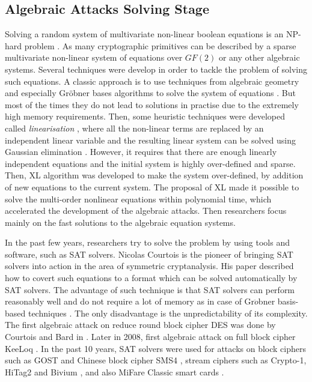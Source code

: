 \subsection{Algebraic Attacks Solving Stage}
Solving a random system of multivariate non-linear boolean equations is an NP-hard problem \cite{fraenkel1980complexity}. As many cryptographic primitives can be described by a sparse multivariate non-linear system of equations over $GF(2)$ or any other algebraic systems. Several techniques were develop in order to tackle the problem of solving such equations. A classic approach is to use techniques from algebraic geometry and especially Gr\"{o}bner bases algorithms to solve the system of equations \cite{faugere1999new}. But most of the times they do not lead to solutions in practise due to the extremely high memory requirements. Then, some heuristic techniques were developed called \textit{linearisation} \cite{courtois2000efficient}, where all the non-linear terms are replaced by an independent linear variable and the resulting linear system can be solved using Gaussian elimination \cite{sepehrdad2012statistical}. However, it requires that there are enough linearly independent equations and the initial system is highly over-defined and sparse. Then, XL algorithm \cite{courtois2000efficient,courtois2002cryptanalysis} was developed to make the system over-defined, by addition of new equations to the current system. The proposal of XL made it possible to solve the multi-order nonlinear equations within polynomial time, which accelerated the development of the algebraic attacks. Then researchers focus mainly on the fast solutions to the algebraic equation systems. 

In the past few years, researchers try to solve the problem by using tools and software, such as SAT solvers. Nicolas Courtois is the pioneer of bringing SAT solvers into action in the area of symmetric cryptanalysis. His paper \cite{cryptoeprint:2007:024,BardCourtoiJeffersonConv} described how to covert such equations to a format which can be solved automatically by SAT solvers. The advantage of such technique is that SAT solvers can perform reasonably well and do not require a lot of memory as in case of Gr$\ddot{o}$bner basis-based techniques \cite{grobner}. The only disadvantage is the unpredictability of its complexity. The first algebraic attack on reduce round block cipher DES was done by Courtois and Bard in  \cite{DEScourtois}. Later in 2008, first algebraic attack on full block cipher KeeLoq \cite{courtois2008algebraicKeeLoq}. In the past 10 years, SAT solvers were used for attacks on block ciphers such as GOST\cite{courtois2012contradiction,gostac} and Chinese block cipher SMS4 \cite{erickson2010algebraic},  stream ciphers such as Crypto-1, HiTag2 and Bivium \cite{soos2009extending,courtois2009practical}, and also MiFare Classic smart cards \cite{courtois2008algebraic}.

